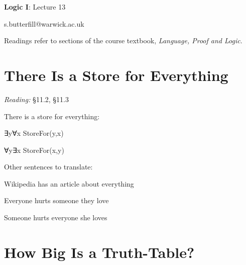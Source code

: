 \documentclass[12pt]{extarticle}
\date{}
\makeatletter
\def \ititle {Origins of Mind}
\def \isubtitle {Lecture 08}
\def \iemail{s.butterfill@warwick.ac.uk}
\makeatother
\begin{document}

\begin{multicols*}{3}

\setlength\footnotesep{1em}









\def \ititle {Logic I}
 
\def \isubtitle {Lecture 13}
 
\begin{center}
 
{\Large
 
\textbf{\ititle}: \isubtitle
 
}
 
 
 
\iemail %
 
\end{center}
 
Readings refer to sections of the course textbook, \emph{Language, Proof and Logic}.
 
 
 
\section{There Is a Store for Everything}
 
\emph{Reading:} §11.2, §11.3
 
There is a store for everything:
 
\hspace{3mm}	∃y∀x StoreFor(y,x)
 
\hspace{3mm} ∀y∃x StoreFor(x,y)
 
Other sentences to translate:
 
\hspace{3mm} Wikipedia has an article about everything
 
\hspace{3mm} Everyone hurts someone they love
 
\hspace{3mm} Someone hurts everyone she loves
 
 
 
\section{How Big Is a Truth-Table?}
 

\end{multicols*}
\end{document}
